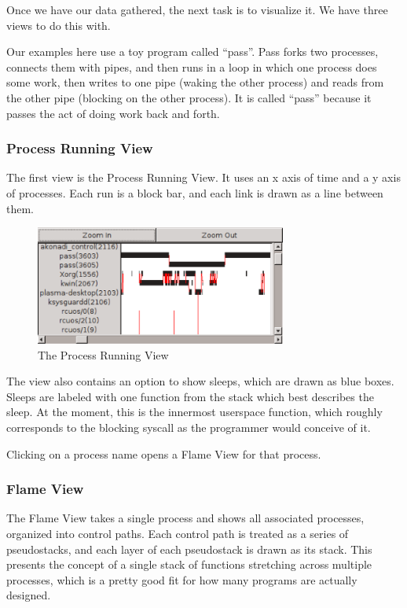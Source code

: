 \documentclass[10pt]{article}
\begin{document}
Once we have our data gathered, the next task is to visualize it.  We have three views to do this with.

Our examples here use a toy program called ``pass''.  Pass forks two processes, connects them with pipes, and then runs in a loop in which one process does some work, then writes to one pipe (waking the other process) and reads from the other pipe (blocking on the other process).  It is called ``pass'' because it passes the act of doing work back and forth.

\subsubsection{Process Running View}

The first view is the Process Running View.  It uses an x axis of time and a y axis of processes.  Each run is a block bar, and each link is drawn as a line between them.

\begin{figure}[h]
\includegraphics[width=3.25in]{screenshot}
\caption{The Process Running View}
\end{figure}

The view also contains an option to show sleeps, which are drawn as blue boxes.  Sleeps are labeled with one function from the stack which best describes the sleep.  At the moment, this is the innermost userspace function, which roughly corresponds to the blocking syscall as the programmer would conceive of it.

Clicking on a process name opens a Flame View for that process.

\subsubsection{Flame View}

The Flame View takes a single process and shows all associated processes, organized into control paths.  Each control path is treated as a series of pseudostacks, and each layer of each pseudostack is drawn as its stack.  This presents the concept of a single stack of functions stretching across multiple processes, which is a pretty good fit for how many programs are actually designed.
\end{document}
